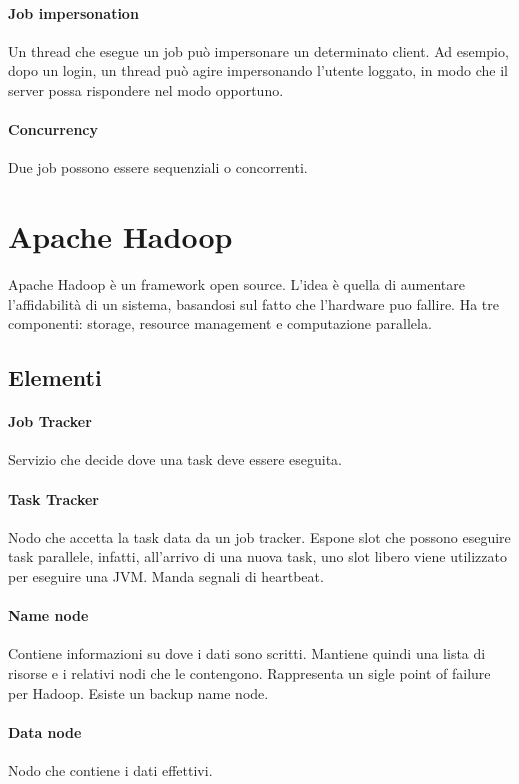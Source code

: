\documentclass[a4paper]{article}
\begin{document}
\paragraph{Job impersonation}
Un thread che esegue un job può impersonare un determinato client.
Ad esempio, dopo un login, un thread può agire impersonando l'utente loggato, 
in modo che il server possa rispondere nel modo opportuno.

\paragraph{Concurrency}
Due job possono essere sequenziali o concorrenti.

\section{Apache Hadoop}
Apache Hadoop è un framework open source. L'idea è quella di aumentare l'affidabilità di un sistema, basandosi sul fatto che l'hardware puo fallire.
Ha tre componenti: storage, resource management e computazione parallela.

\subsection{Elementi}

\paragraph{Job Tracker}
Servizio che decide dove una task deve essere eseguita.

\paragraph{Task Tracker}
Nodo che accetta la task data da un job tracker. Espone slot che possono eseguire
task parallele, infatti, all'arrivo di una nuova task, uno slot libero viene utilizzato per eseguire una JVM. Manda segnali di heartbeat.

\paragraph{Name node}
Contiene informazioni su dove i dati sono scritti. Mantiene quindi una lista 
di risorse e i relativi nodi che le contengono. Rappresenta un sigle point of failure
per Hadoop. Esiste un backup name node.

\paragraph{Data node}
Nodo che contiene i dati effettivi.
\end{document}
